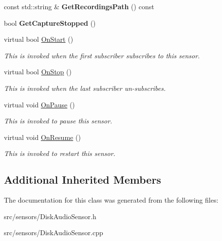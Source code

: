 \begin{DoxyCompactItemize}
const std\+::string \& {\bfseries Get\+Recordings\+Path} () const
\item 
\mbox{\label{class_disk_audio_sensor_a2dd5b3d98892282b5764f7354d30cda1}} 
bool {\bfseries Get\+Capture\+Stopped} ()
\item 
\mbox{\label{class_disk_audio_sensor_af8d84b4e6eb932ecd342a824e8c9d79e}} 
virtual bool \hyperlink{class_disk_audio_sensor_af8d84b4e6eb932ecd342a824e8c9d79e}{On\+Start} ()
\begin{DoxyCompactList}\small\item\em This is invoked when the first subscriber subscribes to this sensor. \end{DoxyCompactList}\item 
\mbox{\label{class_disk_audio_sensor_ae0a2904cd8b1115d25e3fbfec733ed15}} 
virtual bool \hyperlink{class_disk_audio_sensor_ae0a2904cd8b1115d25e3fbfec733ed15}{On\+Stop} ()
\begin{DoxyCompactList}\small\item\em This is invoked when the last subscriber un-\/subscribes. \end{DoxyCompactList}\item 
\mbox{\label{class_disk_audio_sensor_ab77e804b5c6afb2333466dcc77a55b31}} 
virtual void \hyperlink{class_disk_audio_sensor_ab77e804b5c6afb2333466dcc77a55b31}{On\+Pause} ()
\begin{DoxyCompactList}\small\item\em This is invoked to pause this sensor. \end{DoxyCompactList}\item 
\mbox{\label{class_disk_audio_sensor_a6de062e47ee854ab1f041325b3963426}} 
virtual void \hyperlink{class_disk_audio_sensor_a6de062e47ee854ab1f041325b3963426}{On\+Resume} ()
\begin{DoxyCompactList}\small\item\em This is invoked to restart this sensor. \end{DoxyCompactList}\end{DoxyCompactItemize}
\subsection*{Additional Inherited Members}


The documentation for this class was generated from the following files\+:\begin{DoxyCompactItemize}
\item 
src/sensors/Disk\+Audio\+Sensor.\+h\item 
src/sensors/Disk\+Audio\+Sensor.\+cpp\end{DoxyCompactItemize}
